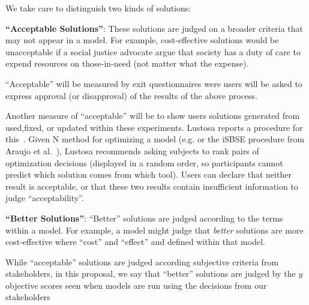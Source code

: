 We take care to distinguish two kinds 
of   solutions:
 
 {\bf ``Acceptable Solutions''}:
 These solutions are judged on a broader criteria that may not appear in a model. 
For example, cost-effective solutions would be  unacceptable if a social justice
advocate argue that society has a duty of care to expend resources on those-in-need (not matter what the expense).
 
 ``Acceptable'' will be measured by  exit questionnaires were users will be asked to express   approval (or disapproval) of the results of the above process.

Another measure of ``acceptable'' will be to show users solutions  generated from   used,fixed, or updated within these experiments. Lustosa reports a procedure for this~\cite{lustosa21}. Given N method for optimizing a model (e.g. {\ITTT} or the iSBSE procedure from   Araujo et al.~\cite{araujo2017architecture}), Lustosa recommends asking 
subjects to rank pairs of 
optimization decisions
(displayed in a random order,
so participants cannot predict which solution comes from which tool).  Users can declare
that neither result is acceptable, or that
 these two results contain insufficient information to judge ``acceptability''.
 
 
 {\bf ``Better Solutions''}:
 ``Better'' solutions
are judged according
to the terms within a  model.
For example, a model might judge that  
 {\em better}
solutions are more cost-effective  where
``cost'' and ``effect'' and defined
within that model.

While
 ``acceptable'' solutions
  are judged according subjective
criteria from   stakeholders,
in this proposal, we say that 
``better'' solutions   are judged   by the $y$ objective
scores seen when models are run using
the decisions from our stakeholders

